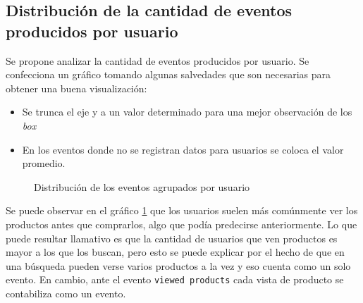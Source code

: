 \documentclass[a4paper]{article}
\begin{document}
\subsection{Distribución de la cantidad de eventos producidos por usuario}

Se propone analizar la cantidad de eventos producidos por usuario. Se confecciona un gráfico tomando algunas salvedades que son necesarias para obtener una buena visualización:

\begin{itemize}
	\item Se trunca el eje y a un valor determinado para una mejor observación de los \textit{box}
	\item En los eventos donde no se registran datos para usuarios se coloca el valor promedio.
\end{itemize}


\begin{figure}[!h]
	\caption{Distribución de los eventos agrupados por usuario}
	\label{fig:boxplot}
\end{figure}

Se puede observar en el gráfico \ref{fig:boxplot} que los usuarios suelen más comúnmente ver los productos antes que comprarlos, algo que podía predecirse anteriormente. Lo que puede resultar llamativo es que la cantidad de usuarios que ven productos es mayor a los que los buscan, pero esto se puede explicar por el hecho de que en una búsqueda pueden verse varios productos a la vez y eso cuenta como un solo evento. En cambio, ante el evento \texttt{viewed products} cada vista de producto se contabiliza como un evento.
\end{document}
